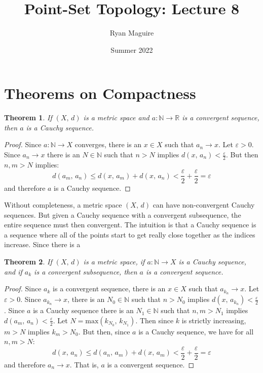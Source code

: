 \documentclass{article}
\title{Point-Set Topology: Lecture 8}
\author{Ryan Maguire}
\date{Summer 2022}
\theoremstyle{plain}
\newtheorem{theorem}{Theorem}[section]
\theoremstyle{normal}
\begin{document}
    \maketitle
    \section{Theorems on Compactness}
        \begin{theorem}
            If $(X,\,d)$ is a metric space and
            $a:\mathbb{N}\rightarrow\mathbb{R}$ is a convergent sequence,
            then $a$ is a Cauchy sequence.
        \end{theorem}
        \begin{proof}
            Since $a:\mathbb{N}\rightarrow{X}$ converges, there is an
            $x\in{X}$ such that $a_{n}\rightarrow{x}$. Let
            $\varepsilon>0$. Since $a_{n}\rightarrow{x}$ there is an
            $N\in\mathbb{N}$ such that $n>N$ implies
            $d(x,\,a_{n})<\frac{\varepsilon}{2}$. But then $n,m>N$ implies:
            \begin{equation}
                d(a_{m},\,a_{n})\leq{d}(x,\,a_{m})+d(x,\,a_{n})
                    <\frac{\varepsilon}{2}+\frac{\varepsilon}{2}
                    =\varepsilon
            \end{equation}
            and therefore $a$ is a Cauchy sequence.
        \end{proof}
        Without completeness, a metric space $(X,\,d)$ can have non-convergent
        Cauchy sequences. But given a Cauchy sequence with a convergent
        subsequence, the entire sequence must then convergent. The intuition is
        that a Cauchy sequence is a sequence where all of the points start to
        get really close together as the indices increase. Since there is a
        \begin{theorem}
            If $(X,\,d)$ is a metric space, if $a:\mathbb{N}\rightarrow{X}$
            is a Cauchy sequence, and if $a_{k}$ is a convergent subsequence,
            then $a$ is a convergent sequence.
        \end{theorem}
        \begin{proof}
            Since $a_{k}$ is a convergent sequence, there is an
            $x\in{X}$ such that $a_{k_{n}}\rightarrow{x}$. Let
            $\varepsilon>0$. Since $a_{k_{n}}\rightarrow{x}$, there is an
            $N_{0}\in\mathbb{N}$ such that $n>N_{0}$ implies
            $d(x,\,a_{k_{n}})<\frac{\varepsilon}{2}$. Since $a$ is a Cauchy
            sequence there is an $N_{1}\in\mathbb{N}$ such that
            $n,m>N_{1}$ implies $d(a_{m},\,a_{n})<\frac{\varepsilon}{2}$.
            Let $N=\textrm{max}(k_{N_{0}},\,k_{N_{1}})$.
            Then since $k$ is strictly increasing,
            $m>N$ implies $k_{m}>N_{0}$. But then, since $a$ is a Cauchy
            sequence, we have for all $n,m>N$:
            \begin{equation}
                d(x,\,a_{n})\leq{d}(a_{n},\,a_{m})+d(x,\,a_{m})
                    <\frac{\varepsilon}{2}+\frac{\varepsilon}{2}=\varepsilon
            \end{equation}
            and therefore $a_{n}\rightarrow{x}$. That is, $a$ is a convergent
            sequence.
        \end{proof}
\end{document}
